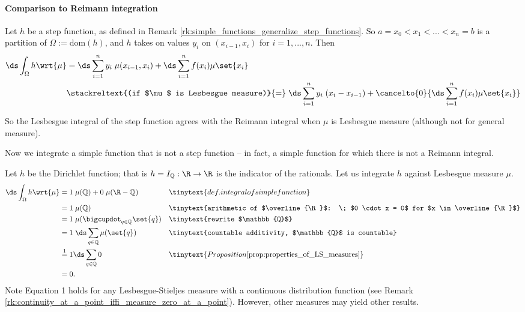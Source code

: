\documentclass{article} %
\renewcommand{\Q}{\mathbb{Q}}
\begin{document}
\paragraph{Comparison to Reimann integration}

\begin{example}{}
Let $h$ be a step function, as defined in Remark \ref{rk:simple_functions_generalize_step_functions}.   So  $a = x_0 < x_1 < ... < x_n = b$ is a partition of $\Omega := \text{dom}(h)$, and $h$ takes on values $y_i$ on $(x_{i-1},x_i)$ for $i=1,...,n$.  Then 
\begin{align*}
\ds\int_{\Omega} h \wrt{\mu} &= \ds\sum_{i=1}^n y_i \; \mu(x_{i-1},x_i) + \ds\sum_{i=1}^n f(x_i) \mu\set{x_i} \\
& \stackreltext{(if $\mu$ is Lesbesgue measure)}{=} \; \ds\sum_{i=1}^n y_i \; (x_i - x_{i-1}) + \cancelto{0}{\ds\sum_{i=1}^n f(x_i) \mu\set{x_i}}
\end{align*}

So the Lesbesgue integral of the step function agrees with the Reimann integral when $\mu$ is Lesbesgue measure (although not for general measure).
\end{example}

Now we integrate a simple function that is not a step function -- in fact, a simple function for which there is not a Reimann integral. 

\begin{example}{}
Let $h$ be the Dirichlet function; that is $h = I_{\Q} : \R \to \R$ is the indicator of the rationals.  Let us integrate $h$ against Lesbesgue measure $\mu$. 
\begin{align*}
\ds\int_{\Omega} h \wrt{\mu} &= 1 \; \mu(\Q) + 0 \; \mu(\R - \Q) && \tinytext{def. integral of simple function} \\
 &= 1 \; \mu(\Q) && \tinytext{arithmetic of $\overline{\R}$: \; $0 \cdot x = 0$ for $x \in \overline{\R}$} \\
 	&= 1 \; \mu(\bigcupdot_{q \in \Q} \set{q}) && \tinytext{rewrite $\Q$} \\
&= 1 \; \ds\sum_{q \in \Q} \mu(\set{q}) && \tinytext{countable additivity, $\Q$ is countable} \\
& \stackrel{1}{=} 1 \ds\sum_{q \in \Q} 0 && \tinytext{Proposition \ref{prop:properties_of_LS_measures}} \\
&= 0.  
\end{align*}
Note Equation 1 holds for any Lesbesgue-Stieljes measure with a continuous distribution function (see Remark \ref{rk:continuity_at_a_point_iffi_measure_zero_at_a_point}).  However, other measures may yield other results.
\label{ex:integrating_the_dirichlet_function}
\end{example}
\end{document}
